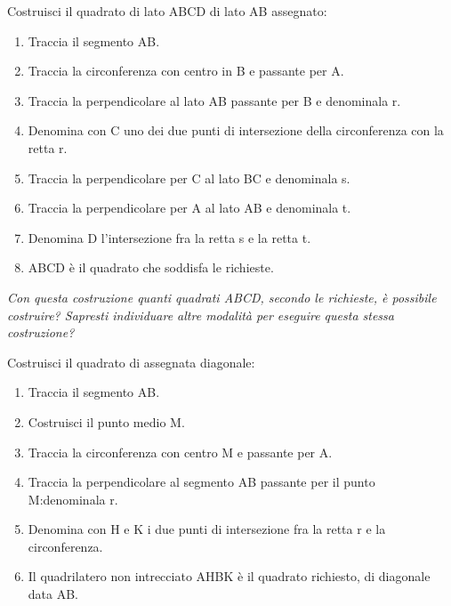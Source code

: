 \begin{procedura}
	Costruisci il quadrato di lato ABCD di lato AB assegnato:
	\begin{enumerate} [nosep]
		\item 
		Traccia il segmento AB.
		\item 
		Traccia la circonferenza con centro in B e passante per A.
		\item 
		Traccia la perpendicolare al lato AB passante per B e denominala r.
		\item 
		Denomina con C uno dei due punti di intersezione della circonferenza con la retta r.
		\item 
		Traccia la perpendicolare per C al lato BC e denominala s.
		\item 
		Traccia la perpendicolare per A al lato AB e denominala t.
		\item
		Denomina D l'intersezione fra la retta s e la retta t.
		\item
		ABCD è il quadrato che soddisfa le richieste.
	\end{enumerate}
	\textit{Con questa costruzione quanti quadrati ABCD, secondo le richieste, è possibile costruire?
		Sapresti individuare altre modalità per eseguire questa stessa costruzione? }
\end{procedura}


\begin{procedura}
	Costruisci il quadrato di assegnata diagonale:
	\begin{enumerate} [nosep]
		\item 
		Traccia il segmento AB.
		\item 
		Costruisci il punto medio M.
		\item 
		Traccia la circonferenza con centro M e passante per A.
		\item 
		Traccia la perpendicolare al segmento AB passante per il punto M:denominala r.
		\item 
		Denomina con H e K i due punti di intersezione fra la retta r e la circonferenza.
		\item 
		Il quadrilatero non intrecciato AHBK è il quadrato richiesto, di diagonale data AB.
	\end{enumerate}
\end{procedura}
% 
% 
% 

